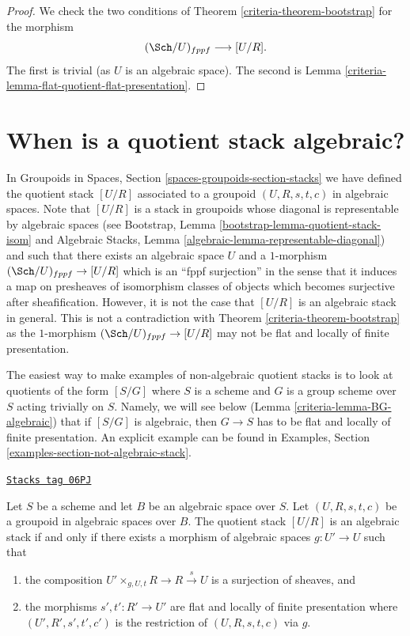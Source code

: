 \begin{proof}

We check the two conditions of
Theorem \ref{criteria-theorem-bootstrap}
for the morphism
$$
(\Sch/U)_{fppf} \longrightarrow [U/R].
$$
The first is trivial (as $U$ is an algebraic space).
The second is
Lemma \ref{criteria-lemma-flat-quotient-flat-presentation}.
\end{proof}

\section{When is a quotient stack algebraic?}
\label{criteria-section-quotient-algebraic}
In
Groupoids in Spaces, Section \ref{spaces-groupoids-section-stacks}
we have defined the quotient stack $[U/R]$ associated to a groupoid
$(U, R, s, t, c)$ in algebraic spaces. Note that $[U/R]$ is a stack
in groupoids whose diagonal is representable by algebraic spaces (see
Bootstrap, Lemma \ref{bootstrap-lemma-quotient-stack-isom}
and
Algebraic Stacks, Lemma \ref{algebraic-lemma-representable-diagonal})
and such that there exists an algebraic space $U$ and a $1$-morphism
$(\Sch/U)_{fppf} \to [U/R]$ which is an ``fppf surjection''
in the sense that it induces a map on presheaves of isomorphism classes of
objects which becomes surjective after sheafification.
However, it is not the case that $[U/R]$ is an algebraic
stack in general. This is not a contradiction with
Theorem \ref{criteria-theorem-bootstrap}
as the $1$-morphism $(\Sch/U)_{fppf} \to [U/R]$ may not
be flat and locally of finite presentation.

\medskip\noindent
The easiest way to make examples of non-algebraic quotient stacks is
to look at quotients of the form $[S/G]$ where $S$ is a scheme and $G$
is a group scheme over $S$ acting trivially on $S$. Namely, we will see
below
(Lemma \ref{criteria-lemma-BG-algebraic})
that if $[S/G]$ is algebraic, then $G \to S$ has to be flat and locally
of finite presentation. An explicit example can be found in
Examples, Section \ref{examples-section-not-algebraic-stack}.

\begin{lemma}
\label{criteria-lemma-quotient-algebraic}
\href{https://stacks.math.columbia.edu/tag/06PJ}{\texttt{Stacks tag 06PJ}}

Let $S$ be a scheme and let $B$ be an algebraic space over $S$.
Let $(U, R, s, t, c)$ be a groupoid in algebraic spaces over $B$.
The quotient stack $[U/R]$ is an algebraic stack if and only if
there exists a morphism of algebraic spaces $g : U' \to U$ such that
\begin{enumerate}
\item the composition
$U' \times_{g, U, t} R \to R \xrightarrow{s} U$ is a surjection of
sheaves, and
\item the morphisms $s', t' : R' \to U'$ are flat and locally of finite
presentation where $(U', R', s', t', c')$ is the restriction of
$(U, R, s, t, c)$ via $g$.
\end{enumerate}
\end{lemma}

